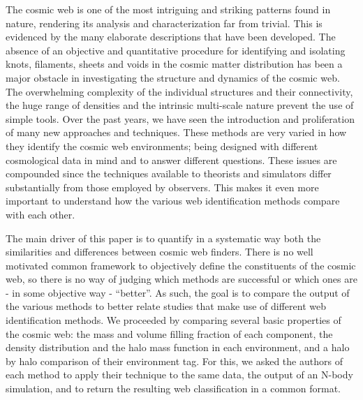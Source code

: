 The cosmic web is one of the most intriguing and striking patterns found in nature, rendering
its analysis and characterization far from trivial. This is evidenced by the many elaborate
descriptions that have been developed. The absence of an objective and quantitative procedure for identifying and isolating knots, filaments, sheets and voids in the cosmic matter distribution has been a major obstacle in investigating the structure and dynamics of the cosmic web. The overwhelming complexity of the individual structures and their connectivity, the huge range of densities and the intrinsic multi-scale nature prevent the use of simple tools. Over the past years, we have seen the introduction and proliferation of many new approaches and techniques. These methods are very varied in how they identify the cosmic web environments; being designed with different cosmological data in mind and to answer different questions. These issues are compounded since the techniques available to theorists and simulators differ substantially from those employed by observers. This makes it even more important to understand how the various web identification methods compare with each other.


The main driver of this paper is to quantify in a systematic way both the similarities and differences between cosmic web finders. There is no well motivated common framework to objectively define the constituents of the cosmic web, so there is no way of judging which methods are successful or which ones are  - in some objective way - ``better''. As such, the goal is to compare the output of the various methods to better relate studies that make use of different web identification methods. We proceeded by comparing several basic properties of the cosmic web: the mass and volume filling fraction of each component, the density distribution and the halo mass function in each environment, and a halo by halo comparison of their environment tag. For this, we asked the authors of each method to apply their technique to the same data, the output of an N-body simulation, and to return the resulting web classification in a common format.


